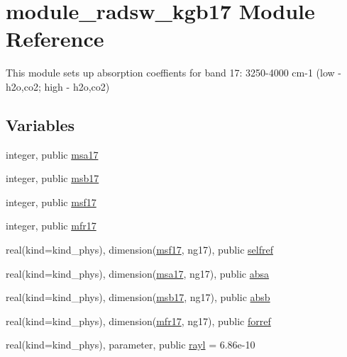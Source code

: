\hypertarget{namespacemodule__radsw__kgb17}{}\section{module\+\_\+radsw\+\_\+kgb17 Module Reference}
\label{namespacemodule__radsw__kgb17}


This module sets up absorption coeffients for band 17\+: 3250-\/4000 cm-\/1 (low -\/ h2o,co2; high -\/ h2o,co2)  


\subsection*{Variables}
\begin{DoxyCompactItemize}
\item 
integer, public \hyperlink{namespacemodule__radsw__kgb17_ac139ff93555c22e658cb767fa7142e08}{msa17}
\item 
integer, public \hyperlink{namespacemodule__radsw__kgb17_afbb056103147b8e5f4d5a8af40420ea0}{msb17}
\item 
integer, public \hyperlink{namespacemodule__radsw__kgb17_a6864c3b95515fb2f408e21298da3952f}{msf17}
\item 
integer, public \hyperlink{namespacemodule__radsw__kgb17_add099d7e1b5e7767d77de6d96673e26f}{mfr17}
\item 
real(kind=kind\+\_\+phys), dimension(\hyperlink{namespacemodule__radsw__kgb17_a6864c3b95515fb2f408e21298da3952f}{msf17}, ng17), public \hyperlink{namespacemodule__radsw__kgb17_aade34dfbe8c5f380088b6e03acc727c9}{selfref}
\item 
real(kind=kind\+\_\+phys), dimension(\hyperlink{namespacemodule__radsw__kgb17_ac139ff93555c22e658cb767fa7142e08}{msa17}, ng17), public \hyperlink{namespacemodule__radsw__kgb17_a19083764c3dfe437282b032517baf3ed}{absa}
\item 
real(kind=kind\+\_\+phys), dimension(\hyperlink{namespacemodule__radsw__kgb17_afbb056103147b8e5f4d5a8af40420ea0}{msb17}, ng17), public \hyperlink{namespacemodule__radsw__kgb17_aef407d13a88f5e1bfd20652ab3010e2f}{absb}
\item 
real(kind=kind\+\_\+phys), dimension(\hyperlink{namespacemodule__radsw__kgb17_add099d7e1b5e7767d77de6d96673e26f}{mfr17}, ng17), public \hyperlink{namespacemodule__radsw__kgb17_a5041a137ba35dca9a767ce854748dd49}{forref}
\item 
real(kind=kind\+\_\+phys), parameter, public \hyperlink{namespacemodule__radsw__kgb17_aa4862628a06e0e08d1db5637bc62ffa5}{rayl} = 6.\+86e-\/10
\end{DoxyCompactItemize}


